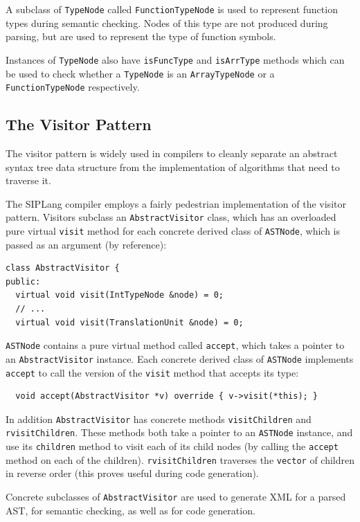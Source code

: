 \documentclass[11pt,a4paper]{scrartcl}
\begin{document}
A subclass of \verb!TypeNode! called \verb!FunctionTypeNode! is used to represent function types during semantic checking. Nodes of this type are not produced during parsing, but are used to represent the type of function symbols.

Instances of \verb!TypeNode! also have \verb!isFuncType! and \verb!isArrType! methods which can be used to check whether a \verb!TypeNode! is an \verb!ArrayTypeNode! or a \verb!FunctionTypeNode! respectively.

\subsection{The Visitor Pattern}

The visitor pattern is widely used in compilers to cleanly separate an abstract syntax tree data structure from the implementation of algorithms that need to traverse it.

The SIPLang compiler employs a fairly pedestrian implementation of the visitor pattern. Visitors subclass an \verb!AbstractVisitor! class, which has an overloaded pure virtual \verb!visit! method for each concrete derived class of \verb!ASTNode!, which is passed as an argument (by reference):

\begin{verbatim}
class AbstractVisitor {
public:
  virtual void visit(IntTypeNode &node) = 0;
  // ...
  virtual void visit(TranslationUnit &node) = 0;
\end{verbatim}

\verb!ASTNode! contains a pure virtual method called \verb!accept!, which takes a pointer to an \verb!AbstractVisitor! instance. Each concrete derived class of \verb!ASTNode! implements \verb!accept! to call the version of the \verb!visit! method that accepts its type:

\begin{verbatim}
  void accept(AbstractVisitor *v) override { v->visit(*this); }
\end{verbatim}

In addition \verb!AbstractVisitor! has concrete methods \verb!visitChildren! and \verb!rvisitChildren!. These methods both take a pointer to an \verb!ASTNode! instance, and use its \verb!children! method to visit each of its child nodes (by calling the \verb!accept! method on each of the children). \verb!rvisitChildren! traverses the \verb!vector! of children in reverse order (this proves useful during code generation).

Concrete subclasses of \verb!AbstractVisitor! are used to generate XML for a parsed AST, for semantic checking, as well as for code generation.
\end{document}
